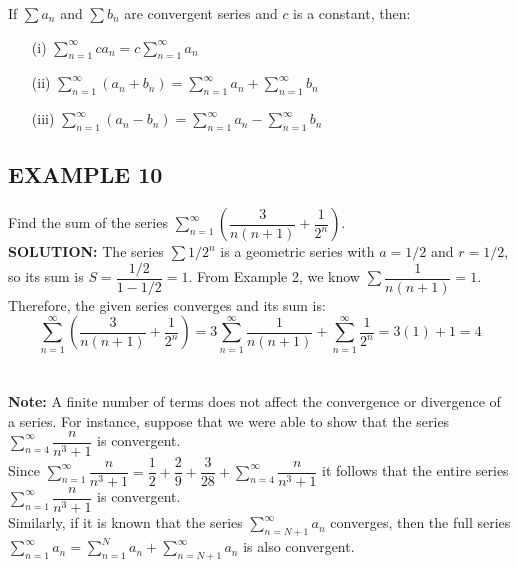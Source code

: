 \documentclass{article}
\theoremstyle{mystyle}
\begin{document}
\begin{tcolorbox}[
    colback=white,
    colframe=orange!80!white,
    title=Properties of Convergent Series,
    boxrule=0.5mm,
    arc=3mm
    ]
    If \( \sum a_n \) and \( \sum b_n \) are convergent series and \(c\) is a constant, then:
    \begin{itemize}
        \item[(i)] \( \sum_{n=1}^{\infty} c a_n = c \sum_{n=1}^{\infty} a_n \)
        \item[(ii)] \( \sum_{n=1}^{\infty} (a_n + b_n) = \sum_{n=1}^{\infty} a_n + \sum_{n=1}^{\infty} b_n \)
        \item[(iii)] \( \sum_{n=1}^{\infty} (a_n - b_n) = \sum_{n=1}^{\infty} a_n - \sum_{n=1}^{\infty} b_n \)
    \end{itemize}
\end{tcolorbox}

\subsection*{EXAMPLE 10}
Find the sum of the series \( \sum_{n=1}^{\infty} \left( \dfrac{3}{n(n+1)} + \dfrac{1}{2^n} \right) \).\\
\textbf{SOLUTION:}
The series \( \sum 1/2^n \) is a geometric series with \(a=1/2\) and \(r=1/2\), so its sum is \( S = \dfrac{1/2}{1-1/2} = 1 \).
From Example 2, we know \( \sum \dfrac{1}{n(n+1)} = 1 \).
Therefore, the given series converges and its sum is:
\[ \sum_{n=1}^{\infty} \left( \dfrac{3}{n(n+1)} + \dfrac{1}{2^n} \right) = 3 \sum_{n=1}^{\infty} \dfrac{1}{n(n+1)} + \sum_{n=1}^{\infty} \dfrac{1}{2^n} = 3(1) + 1 = 4 \]\\\\

\textbf{Note:}
A finite number of terms does not affect the convergence or divergence of a series. For instance, suppose that we were able to show that the series
$\sum_{n=4}^{\infty} \dfrac{n}{n^3 + 1} $
is convergent. \\
Since $\sum_{n=1}^{\infty} \dfrac{n}{n^3 + 1} = \dfrac{1}{2} + \dfrac{2}{9} + \dfrac{3}{28} + \sum_{n=4}^{\infty} \dfrac{n}{n^3 + 1}$
it follows that the entire series \( \sum_{n=1}^{\infty} \dfrac{n}{n^3 + 1} \) is convergent.\\
Similarly, if it is known that the series \( \sum_{n=N+1}^{\infty} a_n \) converges, then the full series
$\sum_{n=1}^{\infty} a_n = \sum_{n=1}^{N} a_n + \sum_{n=N+1}^{\infty} a_n $
is also convergent.
\end{document}
